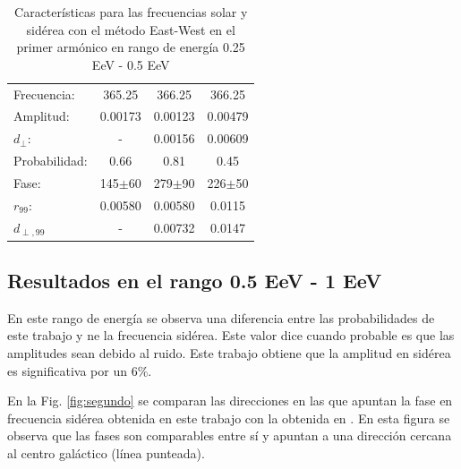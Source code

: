 \begin{table}[H]
    \begin{small}
        \begin{center}
            \begin{tabular}[c]{l|c||c|c}
                Frecuencia:     & 365.25	  & 366.25	   & 366.25 \cite{Aab_2020}   \\
                Amplitud:       & 0.00173	  & 0.00123	   & 0.00479      \\
                $d_\perp$:      & -	          & 0.00156	   & 0.00609       \\
                Probabilidad:   & 0.66        & 0.81	   & 0.45       \\
                Fase:           & 145$\pm$60  & 279$\pm$90 & 226$\pm$50   	\\
                $r_{99}$:       & 0.00580	  & 0.00580    & 0.0115       \\
                $d_{\perp,99}$  & -           & 0.00732    & 0.0147       \\
            \end{tabular}
        \end{center}
    \end{small}
    \caption{Características para las frecuencias solar y sidérea con el método East-West en el primer armónico en rango de energía 0.25 EeV - 0.5 EeV}
    \label{tab:solar}
\end{table}



    


\subsection*{Resultados en el rango 0.5 EeV - 1 EeV}
En este rango de energía se observa una diferencia entre las probabilidades de este trabajo y \cite{Aab_2020}  ne la frecuencia sidérea. Este valor dice cuando probable es que las amplitudes sean debido al ruido. Este trabajo obtiene que la amplitud en sidérea es significativa por un  $6\%$.  

En la Fig. \ref{fig:segundo} se comparan las direcciones en las que apuntan la fase en frecuencia sidérea obtenida en este trabajo con la obtenida en \cite{Aab_2020}. En esta figura se observa que las fases son comparables entre sí y apuntan a una dirección cercana al centro galáctico (línea punteada).


